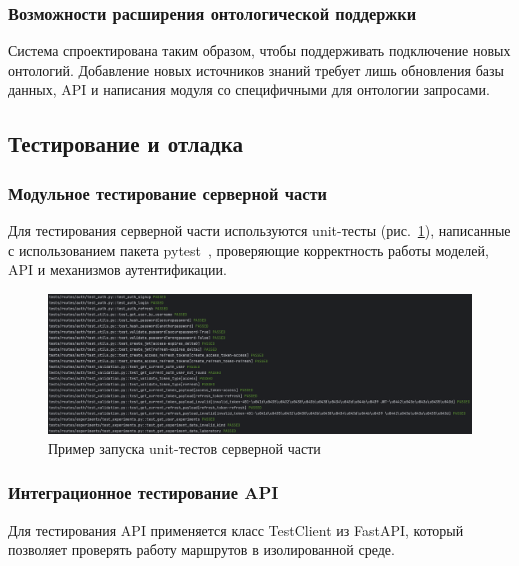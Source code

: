 \subsubsection{Возможности расширения онтологической поддержки}

Система спроектирована таким образом, чтобы поддерживать подключение новых онтологий. Добавление новых источников знаний требует лишь обновления базы данных, API и написания модуля со специфичными для онтологии запросами.


\subsection{Тестирование и отладка}

\subsubsection{Модульное тестирование серверной части}

Для тестирования серверной части используются unit-тесты (рис.~\ref{pic:backend_unit_tests}), написанные с использованием пакета pytest~\cite{Library:Pytest}, проверяющие корректность работы моделей, API и механизмов аутентификации.

\begin{figure}[H]
    \centering
    \includegraphics[width=\linewidth]{img/python_unit_tests.png}
    \caption{Пример запуска unit-тестов серверной части}
    \label{pic:backend_unit_tests}
\end{figure}
\vspace{0.5cm}

\subsubsection{Интеграционное тестирование API}

Для тестирования API применяется класс TestClient из FastAPI, который позволяет проверять работу маршрутов в изолированной среде.

